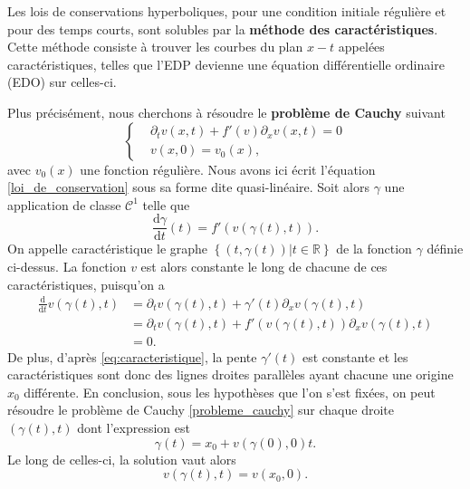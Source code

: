 \documentclass[11pt,a4paper]{article}
\begin{document}
Les lois de conservations hyperboliques, pour une condition initiale régulière et pour des temps courts, sont solubles par la \textbf{méthode des caractéristiques}. Cette méthode consiste à trouver les courbes du plan $x-t$ appelées caractéristiques, telles que l'EDP devienne une équation différentielle ordinaire (EDO) sur celles-ci.

Plus précisément, nous cherchons à résoudre le \textbf{problème de Cauchy} suivant
\begin{equation}\label{probleme_cauchy}
	\left\{
	\begin{aligned}
	&\partial_t v(x,t) + f'(v)\partial_x v(x,t) = 0 \\
	&v(x,0) = v_0(x),
	\end{aligned}
	\right.
\end{equation}
avec $v_0(x)$ une fonction régulière. Nous avons ici écrit l'équation \eqref{loi_de_conservation} sous sa forme dite quasi-linéaire. Soit alors $\gamma$ une application de classe $\mathcal{C}^1$ telle que 
\begin{equation}\label{eq:caracteristique}
	\frac{\mathrm{d}\gamma}{\mathrm{d}t}(t) = f'(v(\gamma(t),t)).
\end{equation}
On appelle caractéristique le graphe $\left\{(t,\gamma(t))|t\in\mathbb{R}\right\}$ de la fonction $\gamma$ définie ci-dessus. La fonction $v$ est alors constante le long de chacune de ces caractéristiques, puisqu'on a
\begin{equation}
	\begin{aligned}
	\frac{\mathrm{d}}{\mathrm{d}t}v(\gamma(t),t) & = \partial_t v(\gamma(t),t) + \gamma '(t)\partial_x v(\gamma(t),t)\\
	& = \partial_t v(\gamma(t), t) + f'(v(\gamma(t),t)) \partial_x v(\gamma(t), t)\\
	& = 0.
	\end{aligned}
\end{equation}
De plus, d'après \eqref{eq:caracteristique}, la pente $\gamma'(t)$ est constante et les caractéristiques sont donc des lignes droites parallèles ayant chacune une origine $x_0$ différente. En conclusion, sous les hypothèses que l'on s'est fixées, on peut résoudre le problème de Cauchy \eqref{probleme_cauchy} sur chaque droite $(\gamma(t), t)$ dont l'expression est
\begin{equation}
	\gamma(t) = x_0 + v(\gamma(0), 0)t.
\end{equation}
Le long de celles-ci, la solution vaut alors
\begin{equation}
	v(\gamma(t), t) = v(x_0, 0).
\end{equation}
\end{document}
